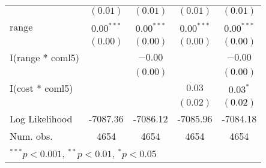 \begin{table}
\begin{center}
\begin{tabular}{l c c c c }
                 & $(0.01)$      & $(0.01)$      & $(0.01)$      & $(0.01)$      \\
range            & $0.00^{***}$  & $0.00^{***}$  & $0.00^{***}$  & $0.00^{***}$  \\
                 & $(0.00)$      & $(0.00)$      & $(0.00)$      & $(0.00)$      \\
I(range * coml5) &               & $-0.00$       &               & $-0.00$       \\
                 &               & $(0.00)$      &               & $(0.00)$      \\
I(cost * coml5)  &               &               & $0.03$        & $0.03^{*}$    \\
                 &               &               & $(0.02)$      & $(0.02)$      \\
\hline
Log Likelihood   & -7087.36      & -7086.12      & -7085.96      & -7084.18      \\
Num. obs.        & 4654          & 4654          & 4654          & 4654          \\
\hline
\multicolumn{5}{l}{\scriptsize{$^{***}p<0.001$, $^{**}p<0.01$, $^*p<0.05$}}
\end{tabular}
\end{center}
\end{table}
